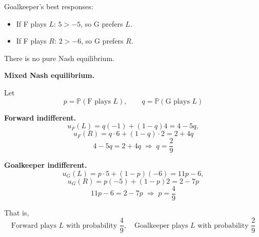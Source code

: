 Goalkeeper's best responses:
\begin{itemize}
\item If F plays $L$: $5 > -5$, so G prefers $L$.
\item If F plays $R$: $2 > -6$, so G prefers $R$.
\end{itemize}

There is no pure Nash equilibrium.

\textbf{Mixed Nash equilibrium.}

Let
\[
p=\mathbb{P}(\text{F plays }L), \qquad
q=\mathbb{P}(\text{G plays }L)
\]

\textbf{Forward indifferent.}
\[
u_F(L)=q(-1)+(1-q)4=4-5q,
\]
\[
u_F(R)=q\cdot 6+(1-q)\cdot 2=2+4q
\]
\[
4-5q=2+4q \;\Rightarrow\; q=\frac{2}{9}
\]

\textbf{Goalkeeper indifferent.}
\[
u_G(L)=p\cdot 5+(1-p)(-6)=11p-6,
\]
\[
u_G(R)=p(-5)+(1-p)2=2-7p
\]
\[
11p-6=2-7p \;\Rightarrow\; p=\frac{4}{9}
\]

That is,
\[
\text{Forward plays }L\text{ with probability }\frac{4}{9}, \quad
\text{Goalkeeper plays }L\text{ with probability }\frac{2}{9}
\]
